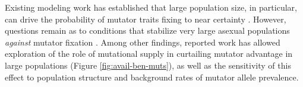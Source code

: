 Existing modeling work has established that large population size, in particular, can drive the probability of mutator traits fixing to near certainty \citep{raynes2018sign,tenaillon1999mutators}.
However, questions remain as to conditions that stabilize very large asexual populations \textit{against} mutator fixation \citep{raynes2019migration}.
Among other findings, reported work has allowed exploration of the role of mutational supply in curtailing mutator advantage in large populations (Figure \ref{fig:avail-ben-muts}), as well as the sensitivity of this effect to population structure and background rates of mutator allele prevalence.




